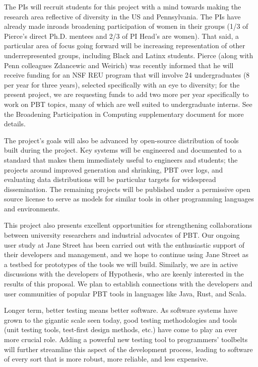 The PIs will recruit students for this project with a mind towards making
the research area reflective of diversity in the US and Pennsylvania.
The PIs have already made inroads broadening participation of women in their
groups (1/3 of Pierce's direct Ph.D. mentees and 2/3 of PI
Head's are women). That said, a particular area of focus going forward
will be increasing representation of
other underrepresented groups, including Black and Latinx
students. Pierce (along with Penn colleagues Zdancewic and Weirich)
was recently informed that he will receive funding for an
NSF REU program that will involve 24 undergraduates (8 per
year for three years), selected specifically with an eye to diversity;
for the present project, we are requesting funds to add two more per
year specifically to work on PBT topics, many of which are well suited
to undergraduate interns. See the Broadening Participation in Computing supplementary
document for more details.

\smallskip
{}
%
The project's goals will also be advanced by open-source distribution of tools
built during the project. Key systems will be engineered and documented to a standard
that makes them immediately useful to engineers and students; the projects around
improved generation and shrinking, PBT over logs, and evaluating data
distributions will be particular targets for widespread
dissemination. The remaining projects will be published under a permissive
open source license to serve as models for similar tools in other
programming languages and environments.

This project also presents excellent opportunities for strengthening
collaborations between university researchers and industrial advocates of PBT.  Our
ongoing user study at Jane Street has been carried out with the
enthusiastic support of their developers and management, and we hope
to continue using Jane Street as a testbed for prototypes of the tools we
will build.  Similarly, we are in active discussions with the
developers of Hypothesis, who are keenly
interested in the results of this proposal.
We plan to establish connections with the
developers and user communities of popular PBT tools in languages like
Java, Rust, and Scala.

Longer term, better testing means better software.  As software
systems have grown to the gigantic scale seen today, good testing
methodologies and tools (unit testing tools, test-first design
methods, etc.) have come to play an ever more crucial role.  Adding a
powerful new testing tool to programmers' toolbelts will further streamline
this aspect of the development process, leading to software of every
sort that is more robust, more reliable, and less expensive.


